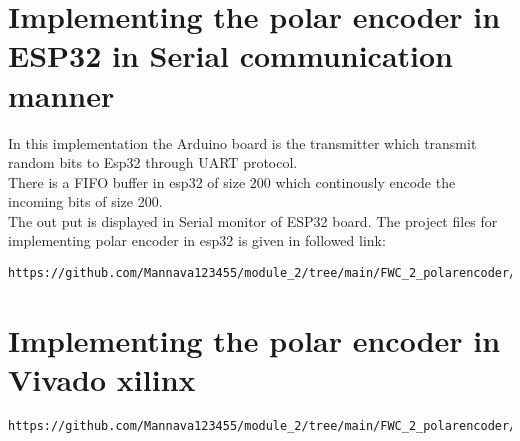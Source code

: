 \documentclass[journal,5pt,twocolumn]{IEEEtran}
\begin{document}
\section{\textbf{Implementing the polar encoder in ESP32 in Serial communication manner}}
In this implementation the Arduino board is the transmitter which transmit random bits to Esp32 through UART protocol. \\
There is a FIFO buffer in esp32 of size 200 which continously encode the incoming bits of size 200.\\
The out put is displayed in Serial monitor of ESP32 board.
The project files for implementing polar encoder in esp32 is given in followed link:
\begin{lstlisting}
https://github.com/Mannava123455/module_2/tree/main/FWC_2_polarencoder/codes/polar_encoder_esp32
 \end{lstlisting}
\section{\textbf{Implementing the polar encoder in Vivado xilinx}}
 \begin{lstlisting}
https://github.com/Mannava123455/module_2/tree/main/FWC_2_polarencoder/codes/polar_encoder_verilog
 \end{lstlisting}
 



 
 
\end{document}

